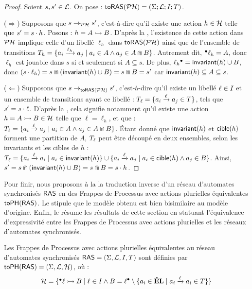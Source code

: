 \begin{proof}
  Soient $s, s' \in \mathcal{L}$.
  On pose : $\mathsf{toRAS}(\mathcal{PH}) = (\Sigma; \mathcal{L}; I; T)$.
  
  ($\Rightarrow$) Supposons que $s \rightarrow_{\mathcal{PH}} s'$, c'est-à-dire qu'il existe une action $h \in \mathcal{H}$
    telle que $s' = s \cdot h$.
    Posons : $h = \mbox{$A \rightarrowtail B$}$.
    D'après la ,
    l'existence de cette action dans $\mathcal{PH}$ implique celle d'un libellé $\ell_h$ dans $\mathsf{toRAS}(\mathcal{PH})$
    ainsi que de l'ensemble de transitions
    $T_h = \{ a_i \xrightarrow{\ell_h} a_j \mid a_i \in A \wedge a_j \in A \Cap B \}$.
    Autrement dit, ${}^\bullet \ell_h = A$, donc $\ell_h$ est jouable dans $s$
    si et seulement si $A \subseteq s$.
    De plus, $\ell_h {}^\bullet = \mathsf{invariant}(h) \cup B$, donc
    $(s \cdot \ell_h) = s \Cap (\mathsf{invariant}(h) \cup B) = s \Cap B = s'$
    car $\mathsf{invariant}(h) \subseteq A \subseteq s$.
  
  ($\Leftarrow$) Supposons que $s \rightarrow_{\mathsf{toRAS}(\mathcal{PH})} s'$,
    c'est-à-dire qu'il existe un libellé $\ell \in I$ et un ensemble de transitions
    ayant ce libellé : $T_\ell = \{ a_i \xrightarrow{\ell} a_j \in T \}$,
    tels que $s' = s \cdot \ell$.
    D'après la , cela signifie notamment qu'il existe une action
    $h = \mbox{$A \rightarrowtail B$} \in \mathcal{H}$ telle que $\ell = \ell_h$, et que :
    $T_\ell = \{ a_i \xrightarrow{\ell} a_j \mid a_i \in A \wedge a_j \in A \Cap B \}$.
    Étant donné que $\mathsf{invariant}(h)$ et $\mathsf{cible}(h)$ forment une partition de $A$,
    $T_\ell$ peut être découpé en deux ensembles, selon les invariants et les cibles de $h$ :
    $T_\ell = \{ a_i \xrightarrow{\ell} a_i \mid a_i \in \mathsf{invariant}(h) \} \cup
      \{ a_i \xrightarrow{\ell} a_j \mid a_i \in \mathsf{cible}(h) \wedge a_j \in B \}$.
    Ainsi, $s' = s \Cap (\mathsf{invariant}(h) \cup B) = s \Cap B = s \cdot h$.
\end{proof}

Pour finir, nous proposons à la  la traduction inverse
d'un réseau d'automates synchronisés $\mathsf{RAS}$
en des Frappes de Processus avec actions plurielles équivalentes $\mathsf{toPH}(\mathsf{RAS})$.
Le  stipule que le modèle obtenu est bien bisimilaire
au modèle d'origine.
Enfin, le  résume les résultats de cette section
en statuant l'équivalence d'expressivité entre les Frappes de Processus avec
actions plurielles et les réseaux d'automates synchronisés.

\begin{definition}
  Les Frappes de Processus avec actions plurielles
  équivalentes au réseau d'automates synchronisés $\mathsf{RAS} = (\Sigma, \mathcal{L}, I, T)$
  sont définies par $\mathsf{toPH}(\mathsf{RAS}) = (\Sigma, \mathcal{L}, \mathcal{H})$, où :
  \[\mathcal{H} = \{ \mbox{${}^\bullet \ell \rightarrowtail B$} \mid \ell \in I \wedge
    B = \ell {}^\bullet \setminus \{ a_i \in \mathbf{\acute{E}L} \mid a_i \xrightarrow{\ell} a_i \in T \}
    \}\]
\end{definition}

